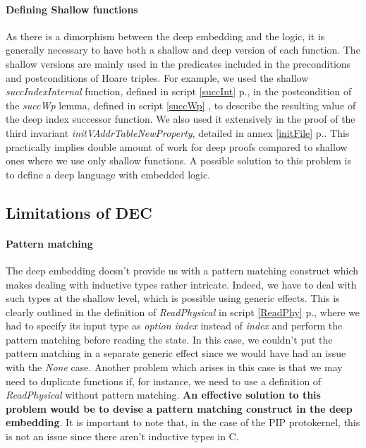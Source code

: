 \paragraph{Defining Shallow functions}
As there is a dimorphism  between the deep embedding and the logic, it is generally necessary to have both a shallow and deep version of each function. The shallow versions are mainly used in the predicates included in the preconditions and postconditions of Hoare triples. For example, we used the shallow \textit{succIndexInternal} function, defined in script \ref{succInt} p.\pageref{succInt}, in the postcondition of the \textit{succWp} lemma, defined in script \ref{succWp} \pageref{succWp}, to describe the resulting value of the deep index successor function. We also used it extensively in the proof of the third invariant \textit{initVAddrTableNewProperty}, detailed in annex \ref{initFile} p.\pageref{initFile}. This practically implies double amount of work for deep proofs compared to shallow ones where we use only shallow functions. A possible solution to this problem is to define a deep language with embedded logic\cite{SoftwareFoundation}. 

\subsection{Limitations of DEC}
\paragraph{Pattern matching}
The deep embedding doesn't provide us with a pattern matching construct which makes dealing with inductive types rather intricate. Indeed, we have to deal with such types at the shallow level, which is possible using generic effects. This is clearly outlined in the definition of \textit{ReadPhysical} in script \ref{ReadPhy} p.\pageref{ReadPhy}, where we had to specify its input type as \textit{option index} instead of \textit{index} and perform the pattern matching before reading the state. In this case, we couldn't put the pattern matching in a separate generic effect since we would have had an issue with the \textit{None} case. Another problem which arises in this case is that we may need to duplicate functions if, for instance, we need to use a definition of \textit{ReadPhysical} without pattern matching. \textbf{An effective solution to this problem would be to devise a pattern matching construct in the deep embedding}. It is important to note that, in the case of the PIP protokernel, this is not an issue since there aren't inductive types in C.
